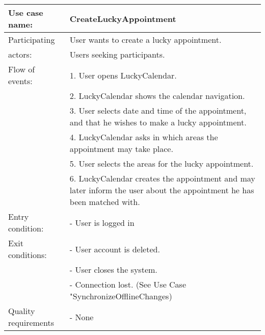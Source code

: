 {\tabulinesep=1.2mm
\begin{tabu}{ | p{3cm} | p{13cm} |}
    \hline
    Use case name: 			& 		CreateLuckyAppointment\\ \hline
    Participating  			& 		User wants to create a lucky appointment. \\
    actors:					&		Users seeking participants.\\ \hline
    Flow of events: 		& 		1. User opens LuckyCalendar. \\
							&		2. LuckyCalendar shows the calendar navigation.\\
							&		3. User selects date and time of the appointment, and that he wishes to make a lucky appointment.\\
							&		4. LuckyCalendar asks in which areas the appointment may take place.\\
							&		5. User selects the areas for the lucky appointment.\\
							&		6. LuckyCalendar creates the appointment and may later inform the user about the appointment he has been matched with.\\ \hline
    Entry condition: 		& 		- User is logged in  \\\hline
	Exit conditions: 		&		- User account is deleted.\\
							&		- User closes the system.\\
							&		- Connection lost. (See Use Case "SynchronizeOfflineChanges)\\\hline
	Quality requirements	&	 	- None \\\hline
\end{tabu}
}